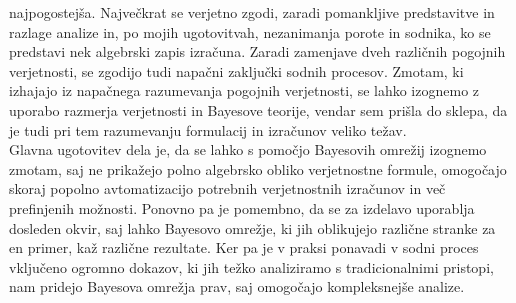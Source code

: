\documentclass[fin1, tisk]{fmfdelo}
\theoremstyle{definition} %
\theoremstyle{trditev} %
\theoremstyle{izrek}
\begin{document}
najpogostejša. Največkrat se verjetno zgodi, zaradi pomankljive predstavitve in razlage analize in, po mojih ugotovitvah, nezanimanja porote in sodnika, ko se predstavi
nek algebrski zapis izračuna. Zaradi zamenjave dveh različnih pogojnih verjetnosti, se zgodijo tudi napačni zaključki sodnih procesov. Zmotam, ki izhajajo iz napačnega
razumevanja pogojnih verjetnosti, se lahko izognemo z uporabo razmerja verjetnosti in Bayesove teorije, vendar sem prišla do sklepa, da je tudi pri tem razumevanju
formulacij in izračunov veliko težav. \\
Glavna ugotovitev dela je, da se lahko s pomočjo Bayesovih omrežij izognemo zmotam, saj ne prikažejo polno algebrsko obliko verjetnostne formule, omogočajo skoraj popolno
avtomatizacijo potrebnih verjetnostnih izračunov in več prefinjenih možnosti. Ponovno pa je pomembno, da se za izdelavo uporablja dosleden okvir, saj lahko Bayesovo omrežje,
ki jih oblikujejo različne stranke za en primer, kaž različne rezultate. Ker pa je v praksi ponavadi v sodni proces vključeno ogromno dokazov, ki jih težko analiziramo s
tradicionalnimi pristopi, nam pridejo Bayesova omrežja prav, saj omogočajo kompleksnejše analize.
\end{document}
